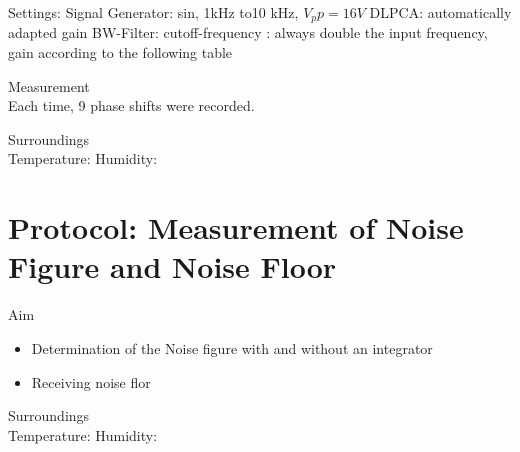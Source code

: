 Settings: \newline
Signal Generator:  sin, 1kHz to10 kHz, $V_pp=16V$
DLPCA:  automatically adapted gain
BW-Filter:  cutoff-frequency : always double the input frequency, gain according to the following table

\large{Measurement} \\
Each time, 9 phase shifts were recorded. 

\large{Surroundings} \\
Temperature: 
Humidity: 


\section{Protocol: Measurement of Noise Figure and Noise Floor}
\large{Aim} \\
\begin{itemize}
\item Determination of the Noise figure with and without an integrator
\item Receiving noise flor 
\end{itemize}

\large{Surroundings} \\
Temperature:  
Humidity: 